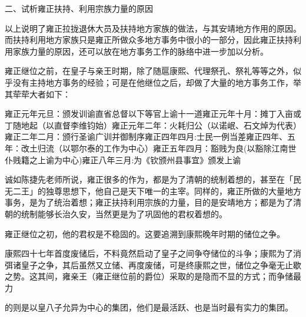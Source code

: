 二、试析雍正扶持、利用宗族力量的原因

以上说明了雍正拉拢退休大员及扶持地方家族的做法，与其安靖地方作用的原因。而扶持利用地方家族只是雍正所做众多地方事务中很小的一部分，因此雍正扶持利用家族力量的原因，还可以放在地方事务工作的脉络中进一步加以分析。

\vfill
\begin{BookNotes}
\end{BookNotes}


雍正继位之前，在皇子与亲王时期，除了随扈康熙、代理祭孔、祭礼等等之外，似乎没有主持地方事务的经验；可是在他继位之后，却做了大量的地方事务工作，举其荦荦大者如下：

\begin{BookQuote}
雍正元年元旦：颁发训谕直省总督以下等官上谕十一道雍正元年十月：摊丁入亩或丁随地起（以直督李维钧始）雍正元年二年：火耗归公（以诺岷、石文焯为代表）雍正二年二月：颁行圣谕广训并御制序雍正四年四月:士民一例当差雍正四年、五年：改土归流（以鄂尔泰的工作为中心）雍正五年四月：豁贱为良(以豁除江南世仆贱籍之上谕为中心)雍正八年三月:为《钦颁州县事宜》颁发上谕
\end{BookQuote}

诚如陈捷先老师所说，雍正很多的作为，都是为了清朝的统制着想的，甚至在「民无二王」的独尊思想下，他自己是天下唯一的主宰。同样的，雍正所做的大量地方事务，是为了统治着想；雍正扶持利用宗族的力量，目的是安靖地方；都是为了清朝的统制能够长治久安，当然更是为了巩固他的君权着想的。


雍正继位之初，他的君权是不稳固的。这要追溯到康熙晚年时期的储位之争。

康熙四十七年首度废储后，不料竟然启动了皇子之间争夺储位的斗争；康熙为了消弭诸皇子之争，其后虽然又立储、再度废储，可是终康熙之世，储位之争毫无止歇之势。这其间，雍亲王（雍正继位前的爵位）采取的是隐而不显的方式；而争储最力

\vfill
\begin{BookNotes}
\end{BookNotes}

\noindent 的则是以皇八子允异为中心的集团，他们是最活跃、也是当时最有实力的集团。

